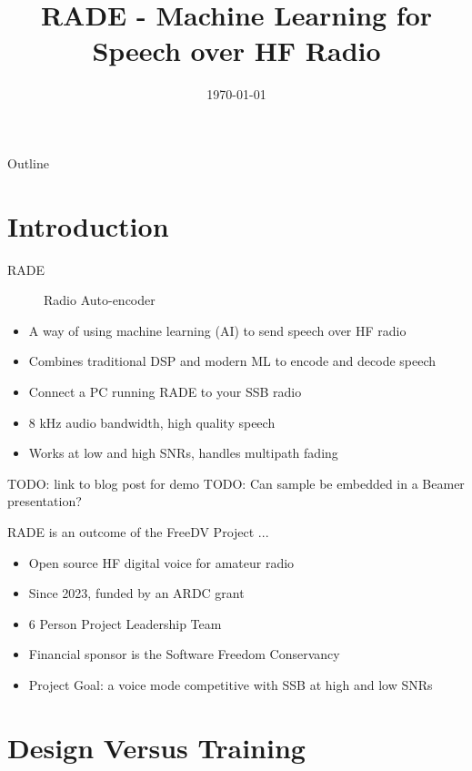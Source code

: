 \documentclass{beamer}
\title[RADE]{RADE - Machine Learning for Speech over HF Radio}
\institute[freedv.org]{freedv.org \and Supported by a grant from Amateur Radio Digital Communications}
\date[]{\today}
\begin{document}
\begin{frame}
    \titlepage
\end{frame}

\begin{frame}{Outline}
    \tableofcontents
\end{frame}

\section{Introduction}

\begin{frame}
\begin{description}
    \item[RADE] Radio Auto-encoder
\end{description}
\begin{itemize}
   \item A way of using machine learning (AI) to send speech over HF radio 
   \item Combines traditional DSP and modern ML to encode and decode speech
   \item Connect a PC running RADE to your SSB radio
   \item 8 kHz audio bandwidth, high quality speech
   \item Works at low and high SNRs, handles multipath fading
\end{itemize}
\end{frame}

\begin{frame}
	TODO: link to blog post for demo
	TODO: Can sample be embedded in a Beamer presentation?
\end{frame}

\begin{frame}
RADE is an outcome of the FreeDV Project ...
\begin{itemize}
    \item Open source HF digital voice for amateur radio
    \item Since 2023, funded by an ARDC grant
    \item 6 Person Project Leadership Team
    \item Financial sponsor is the Software Freedom Conservancy
    \item Project Goal: a voice mode competitive with SSB at high and low SNRs
\end{itemize}
\end{frame}

\section{Design Versus Training}
\end{document}
